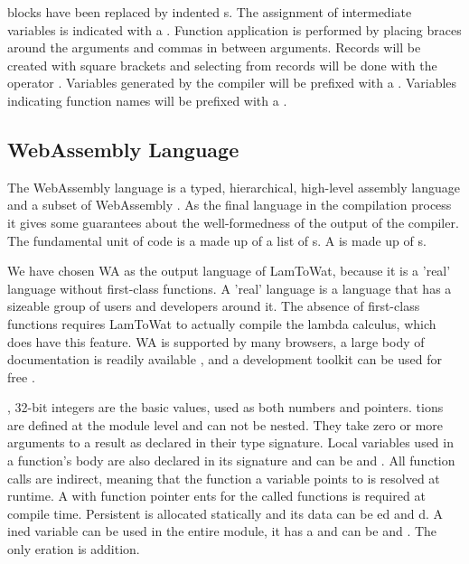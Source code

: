 { blocks have been replaced by indented s. The assignment of intermediate variables is indicated with a \icode{<-}. Function application is performed by placing braces around the arguments and commas in between arguments. Records will be created with square brackets \icode{[1,2,3]} and selecting from records will be done with the operator \icode{!!}. Variables generated by the compiler will be prefixed with a . Variables indicating function names will be prefixed with a \icode{_}.

\subsection{\label{subsection:webdata}WebAssembly Language}
The WebAssembly language is a typed, hierarchical, high-level assembly language and a subset of WebAssembly \autocite{webassemblyhomepage}. As the final language in the compilation process it gives some guarantees about the well-formedness of the output of the compiler. The fundamental unit of code is a  made up of a list of s. A  is made up of s.

We have chosen \ac{WA} as the output language of LamToWat, because it is a 'real' language without first-class functions. A 'real' language is a language that has a sizeable group of users and developers around it. The absence of first-class functions requires LamToWat to actually compile the lambda calculus, which does have this feature. \ac{WA} is supported by many browsers, a large body of documentation is readily available \autocite{webassemblydocs}, and a development toolkit can be used for free \autocite{wabt}.

, 32-bit integers are the basic values, used as both numbers and pointers. tions are defined at the module level and can not be nested. They take zero or more arguments to a result as declared in their type signature. Local variables used in a function's body are also declared in its signature and can be  and . All function calls are indirect, meaning that the function a variable points to is resolved at runtime. A  with function pointer ents for the called functions is required at compile time. Persistent  is allocated statically and its data can be ed and d. A ined variable can be used in the entire module, it has a  and can be  and . The only eration is addition.

}
